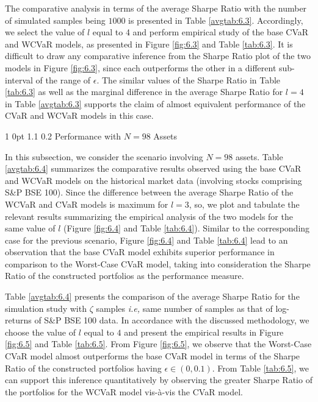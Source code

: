 \documentclass[12pt]{article}
\makeatletter
\numberwithin{equation}{section}
\renewcommand{\subsubsection}{
  \@startsection
  {subsubsection}%
  {1}%
  {0pt}%
  {1.1\baselineskip}%
  {0.2\baselineskip}%
  {\sc \centering}%
}
\makeatother
\begin{document}
The comparative analysis in terms of the average Sharpe Ratio with the number of simulated samples being $1000$ is presented in Table \ref{avgtab:6.3}. Accordingly, we select the value of $l$ equal to 4 and perform empirical study of the base CVaR and WCVaR models, as presented in Figure \ref{fig:6.3} and Table \ref{tab:6.3}. It is difficult to draw any comparative inference from the Sharpe Ratio plot of the two models in Figure \ref{fig:6.3}, since each outperforms the other in a different sub-interval of the range of $\epsilon$. The similar values of the Sharpe Ratio in Table \ref{tab:6.3} as well as the marginal difference in the average Sharpe Ratio for $l=4$ in Table \ref{avgtab:6.3} supports the claim of almost equivalent performance of the CVaR and WCVaR models in this case.

\subsubsection{Performance with $N=98$ Assets}

In this subsection, we consider the scenario involving $N=98$ assets. Table \ref{avgtab:6.4} summarizes the comparative results observed using the base CVaR and WCVaR models on the historical market data (involving stocks comprising S\&P BSE 100). Since the difference between the average Sharpe Ratio of the WCVaR and CVaR models is maximum for $l=3$, so, we plot and tabulate the relevant results summarizing the empirical analysis of the two models for the same value of $l$ (Figure \ref{fig:6.4} and Table \ref{tab:6.4}). Similar to the corresponding case for the previous scenario, Figure \ref{fig:6.4} and Table \ref{tab:6.4} lead to an observation that the base CVaR model exhibits superior performance in comparison to the Worst-Case CVaR model, taking into consideration the Sharpe Ratio of the constructed portfolios as the performance measure.

Table \ref{avgtab:6.4} presents the comparison of the average Sharpe Ratio for the simulation study with $\zeta$ samples \textit{i.e,} same number of samples as that of log-returns of S\&P BSE 100 data. In accordance with the discussed methodology, we choose the value of $l$ equal to $4$ and present the empirical results in Figure \ref{fig:6.5} and Table \ref{tab:6.5}. From Figure \ref{fig:6.5}, we observe that the Worst-Case CVaR model almost outperforms the base CVaR model in terms of the Sharpe Ratio of the constructed portfolios having $\epsilon \in (0,0.1)$. From Table \ref{tab:6.5}, we can support this inference quantitatively by observing the greater Sharpe Ratio of the portfolios for the WCVaR model vis-\`a-vis the CVaR model.
\end{document}
